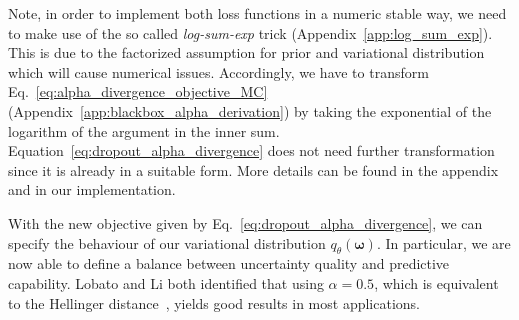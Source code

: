 \documentclass[runningheads]{llncs}
\begin{document}
Note, in order to implement both loss functions in a numeric stable way, we need to make use of the so called \textit{log-sum-exp} trick (Appendix~\ref{app:log_sum_exp}). %
This is due to the factorized assumption for prior and variational distribution which will cause numerical issues.
Accordingly, we have to transform  Eq.~\ref{eq:alpha_divergence_objective_MC} (Appendix~\ref{app:blackbox_alpha_derivation}) by taking the exponential of the logarithm of the argument in the inner sum.
Equation~\ref{eq:dropout_alpha_divergence} does not need further transformation since it is already in a suitable form.
More details can be found in the appendix and in our implementation.

With the new objective given by Eq.~\ref{eq:dropout_alpha_divergence}, we can specify the behaviour of our variational distribution $q_\theta(\boldsymbol{\omega})$. 
In particular, we are now able to define a balance between uncertainty quality and predictive capability.
Lobato and Li both identified that using $\alpha=0.5$, which is equivalent to the Hellinger distance~\cite{li2017dropout}, yields good results in most applications.

\end{document}
